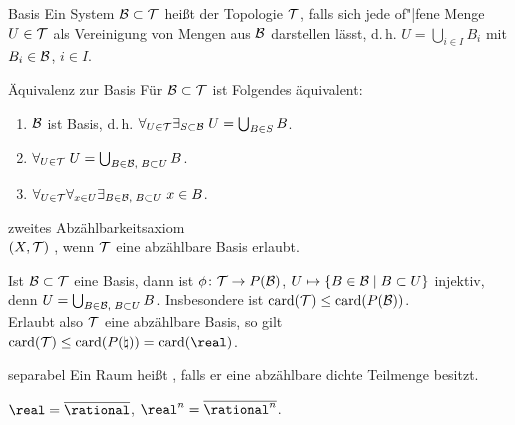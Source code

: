 \linie

\begin{Def}{Basis}
    Ein System $\mathcal{B} \subset \mathcal{T}$ heißt  der Topologie $\mathcal{T}$, falls
    sich jede of"|fene Menge $U \in \mathcal{T}$ als Vereinigung von Mengen aus $\mathcal{B}$
    darstellen lässt, d.\,h. $U = \bigcup_{i \in I} B_i$ mit $B_i \in \mathcal{B}$,
    $i \in I$.
\end{Def}

\begin{Satz}{Äquivalenz zur Basis}
    Für $\mathcal{B} \subset \mathcal{T}$ ist Folgendes äquivalent:
    \begin{enumerate}
        \item
        $\mathcal{B}$ ist Basis, d.\,h.
        $\forall_{U \in \mathcal{T}} \exists_{S \subset \mathcal{B}}\; U = \bigcup_{B \in S} B$.
        
        \item
        $\forall_{U \in \mathcal{T}}\; U = \bigcup_{B \in \mathcal{B},\; B \subset U} B$.
        
        \item
        $\forall_{U \in \mathcal{T}} \forall_{x \in U}
        \exists_{B \in \mathcal{B},\; B \subset U}\; x \in B$.
    \end{enumerate}
\end{Satz}

\linie

\begin{Def}{zweites Abzählbarkeitsaxiom} \\
    $(X, \mathcal{T})$ , wenn $\mathcal{T}$ eine
    abzählbare Basis erlaubt.
\end{Def}

\begin{Kor}
    Ist $\mathcal{B} \subset \mathcal{T}$ eine Basis, dann ist
    $\phi\colon \mathcal{T} \rightarrow P(\mathcal{B})$,
    $U \mapsto \{B \in \mathcal{B} \;|\; B \subset U\}$
    injektiv, denn $U = \bigcup_{B \in \mathcal{B},\; B \subset U} B$.
    Insbesondere ist $\operatorname{card}(\mathcal{T}) \le \operatorname{card}(P(\mathcal{B}))$. \\
    Erlaubt also $\mathcal{T}$ eine abzählbare Basis, so gilt
    $\card(\T) \le \card(P(\natural)) = \card(\real)$.
\end{Kor}

\begin{Def}{separabel}
    Ein Raum heißt , falls er eine abzählbare dichte
    Teilmenge besitzt.
\end{Def}

\begin{Bsp}
    $\real = \abschluss{\rational}$,
    $\real^n = \abschluss{\rational^n}$.
\end{Bsp}

